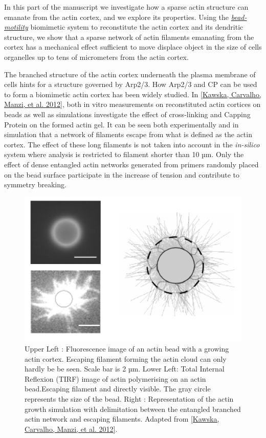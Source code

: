 \documentclass[A4paperpaper,11pt,english]{sphinxmanual}
\begin{document}
In this part of the manuscript we investigate how a sparse actin structure can
emanate from the actin cortex, and we explore its properties. Using the
{\hyperref[parts/part1:bead-motility-assay]{\emph{bead-motility}}} biomimetic system to reconstitute
the actin cortex and its dendritic structure, we show that a sparse network of
actin filaments emanating from the cortex has a mechanical effect sufficient to
move displace object in the size of cells organelles  up to tens of micrometers
from the actin cortex.

The branched structure of the actin cortex underneath the plasma membrane of
cells hints for a structure governed by Arp2/3. How Arp2/3 and CP can be used
to form a biomimetic actin cortex has been widely studied. In
{\hyperref[parts/part3:kawska2012]{{[}Kawska, Carvalho, Manzi,  et al.  2012{]}}}, both in vitro measurements on reconstituted actin cortices
on beads as well as simulations investigate the effect of cross-linking and
Capping Protein on the formed actin gel. It can be seen both experimentally and in
simulation that a network of filaments escape from what is defined as the actin
cortex. The effect of these long filaments is not taken into account in the
\emph{in-silico} system where analysis is restricted to filament shorter than 10
µm. Only the effect of dense entangled actin networks generated from primers
randomly placed  on the bead surface participate in the increase of tension and
contribute to symmetry breaking.
\begin{figure}[htbp]
\centering
\capstart

\includegraphics[width=0.700\linewidth]{Bead-tirf-fluo-sim.png}
\caption{Upper Left : Fluorescence image of an actin bead with a growing actin
cortex. Escaping filament  forming the actin cloud can only hardly be  be
seen. Scale bar is 2 µm. Lower Left: Total Internal Reflexion (TIRF) image
of actin polymerising on an actin bead.Escaping filament and directly
visible. The gray circle represents the size of the bead.  Right :
Representation of the actin growth simulation with delimitation between the
entangled branched actin network and escaping filaments.  Adapted from
{\hyperref[parts/part3:kawska2012]{{[}Kawska, Carvalho, Manzi,  et al.  2012{]}}}.}\end{figure}
\end{document}
